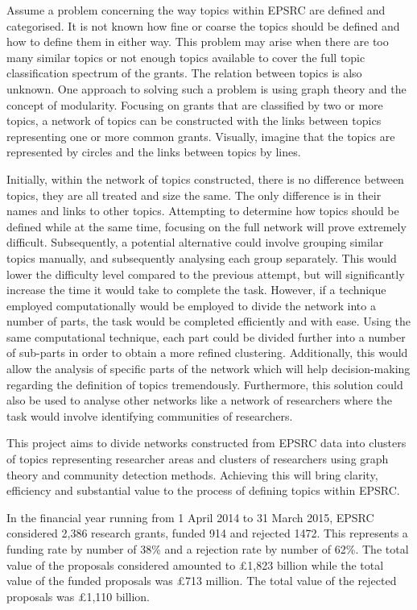 Assume a problem concerning the way topics within EPSRC are defined and categorised. It is not known how fine or coarse the topics should be defined and how to define them in either way. This problem may arise when there are too many similar topics or not enough topics available to cover the full topic classification spectrum of the grants. The relation between topics is also unknown. One approach to solving such a problem is using graph theory and the concept of modularity. Focusing on grants that are classified by two or more topics, a network of topics can be constructed with the links between topics representing one or more common grants. Visually, imagine that the topics are represented by circles and the links between topics by lines.

Initially, within the network of topics constructed, there is no difference between topics, they are all treated and size the same. The only difference is in their names and links to other topics. Attempting to determine how topics should be defined while at the same time, focusing on the full network will prove extremely difficult. Subsequently, a potential alternative could involve grouping similar topics manually, and subsequently analysing each group separately. This would lower the difficulty level compared to the previous attempt, but will significantly increase the time it would take to complete the task. However, if a technique employed computationally would be employed to divide the network into a number of parts, the task would be completed efficiently and with ease. Using the same computational technique, each part could be divided further into a number of sub-parts in order to obtain a more refined clustering. Additionally, this would allow the analysis of specific parts of the network which will help decision-making regarding the definition of topics tremendously. Furthermore, this solution could also be used to analyse other networks like a network of researchers where the task would involve identifying communities of researchers.

This project aims to divide networks constructed from EPSRC data into clusters of topics representing researcher areas and clusters of researchers using graph theory and community detection methods. Achieving this will bring clarity, efficiency and substantial value to the process of defining topics within EPSRC.

\iffalse
In the financial year running from 1 April 2014 to 31 March 2015, EPSRC considered 2,386 research grants, funded 914 and rejected 1472. This represents a funding rate by number of 38\% and a rejection rate by number of 62\%. The total value of the proposals considered amounted to \pounds1,823 billion while the total value of the funded proposals was \pounds713 million. The total value of the rejected proposals was \pounds1,110 billion.

